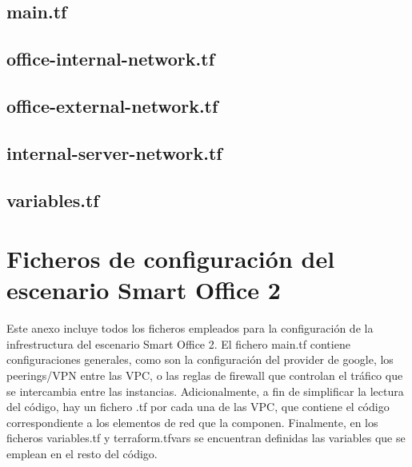 \section*{main.tf} 


\section*{office-internal-network.tf}

\clearpage

\section*{office-external-network.tf}


\section*{internal-server-network.tf}

\clearpage

\section*{variables.tf}


\chapter{Ficheros de configuración del escenario Smart Office 2} \label{anx:soII}
  Este anexo incluye todos los ficheros empleados para la configuración de la infrestructura del escenario Smart Office 2. El fichero main.tf contiene configuraciones generales, como son la configuración del provider de google, los peerings/VPN entre las VPC, o las reglas de firewall que controlan el tráfico que se intercambia entre las instancias. Adicionalmente, a fin de simplificar la lectura del código, hay un fichero .tf por cada una de las VPC, que contiene el código correspondiente a los elementos de red que la componen. Finalmente, en los ficheros variables.tf y terraform.tfvars se encuentran definidas las variables que se emplean en el resto del código.

